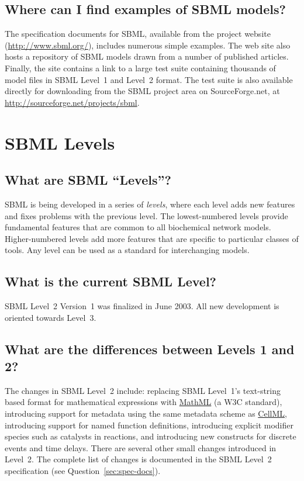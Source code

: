 \documentclass{sbmlfaq}
\begin{document}
\subsection{Where can I find examples of SBML models?}

The specification documents for SBML, available from the project website
(\url{http://www.sbml.org/}), includes numerous simple examples.  The web
site also hosts a repository of SBML models drawn from a number of
published articles.  Finally, the site contains a link to a large test
suite containing thousands of model files in SBML Level~1 and Level~2
format.  The test suite is also available directly for downloading from the
SBML project area on SourceForge.net, at
\url{http://sourceforge.net/projects/sbml}.


\section{SBML Levels}
\label{sec:sbml-levels}

\subsection{What are SBML ``Levels''?}

SBML is being developed in a series of \emph{levels}, where each level adds
new features and fixes problems with the previous level.  The
lowest-numbered levels provide fundamental features that are common to all
biochemical network models.  Higher-numbered levels add more features that
are specific to particular classes of tools.  Any level can be used as a
standard for interchanging models.

\subsection{What is the current SBML Level?}

SBML Level~2 Version~1 was finalized in June 2003.  All new development is
oriented towards Level~3.


\subsection{What are the differences between Levels 1 and 2?}

The changes in SBML Level~2 include: replacing SBML Level~1's text-string
based format for mathematical expressions with
\href{http://www.w3.org/TR/2003/WD-MathML2-20030411/}{MathML} (a W3C
standard), introducing support for metadata using the same metadata scheme
as \href{http://www.cellml.org}{CellML}, introducing support for named
function definitions, introducing explicit modifier species such as
catalysts in reactions, and introducing new constructs for discrete events
and time delays.  There are several other small changes introduced in
Level~2.  The complete list of changes is documented in the SBML Level~2
specification (see Question~\ref{sec:spec-docs}).
\end{document}
